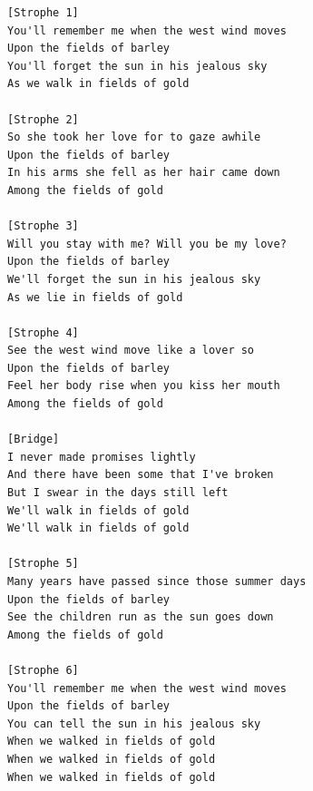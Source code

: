 \begin{verbatim}
[Strophe 1]
You'll remember me when the west wind moves
Upon the fields of barley
You'll forget the sun in his jealous sky
As we walk in fields of gold

[Strophe 2]
So she took her love for to gaze awhile
Upon the fields of barley
In his arms she fell as her hair came down
Among the fields of gold

[Strophe 3]
Will you stay with me? Will you be my love?
Upon the fields of barley
We'll forget the sun in his jealous sky
As we lie in fields of gold

[Strophe 4]
See the west wind move like a lover so
Upon the fields of barley
Feel her body rise when you kiss her mouth
Among the fields of gold

[Bridge]
I never made promises lightly
And there have been some that I've broken
But I swear in the days still left
We'll walk in fields of gold
We'll walk in fields of gold

[Strophe 5]
Many years have passed since those summer days
Upon the fields of barley
See the children run as the sun goes down
Among the fields of gold

[Strophe 6]
You'll remember me when the west wind moves
Upon the fields of barley
You can tell the sun in his jealous sky
When we walked in fields of gold
When we walked in fields of gold
When we walked in fields of gold
\end{verbatim}